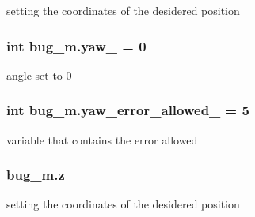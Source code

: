 setting the coordinates of the desidered position 

\subsubsection[{\texorpdfstring{yaw\+\_\+}{yaw_}}]{\setlength{\rightskip}{0pt plus 5cm}int bug\+\_\+m.\+yaw\+\_\+ = 0}\hypertarget{namespacebug__m_a8b5b5c9259592b8efd526c5adb95d95b}{}\label{namespacebug__m_a8b5b5c9259592b8efd526c5adb95d95b}


angle set to 0 

\subsubsection[{\texorpdfstring{yaw\+\_\+error\+\_\+allowed\+\_\+}{yaw_error_allowed_}}]{\setlength{\rightskip}{0pt plus 5cm}int bug\+\_\+m.\+yaw\+\_\+error\+\_\+allowed\+\_\+ = 5}\hypertarget{namespacebug__m_a23e5e76f14d9d0d139767cb229a53dda}{}\label{namespacebug__m_a23e5e76f14d9d0d139767cb229a53dda}


variable that contains the error allowed 

\subsubsection[{\texorpdfstring{z}{z}}]{\setlength{\rightskip}{0pt plus 5cm}bug\+\_\+m.\+z}\hypertarget{namespacebug__m_afbb54887da57b97920c8d36c6daed1fc}{}\label{namespacebug__m_afbb54887da57b97920c8d36c6daed1fc}


setting the coordinates of the desidered position 

